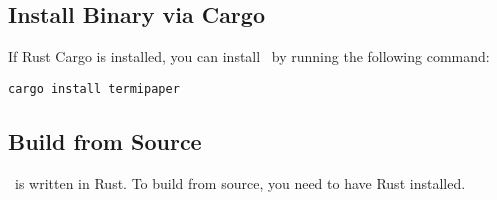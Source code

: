 \subsection{Install Binary via Cargo}
If Rust Cargo is installed,
you can install \TermiPaper\ by running the following command:
\begin{verbatim}
cargo install termipaper
\end{verbatim}

\subsection{Build from Source}
\TermiPaper\ is written in Rust.
To build from source, you need to have Rust installed.
